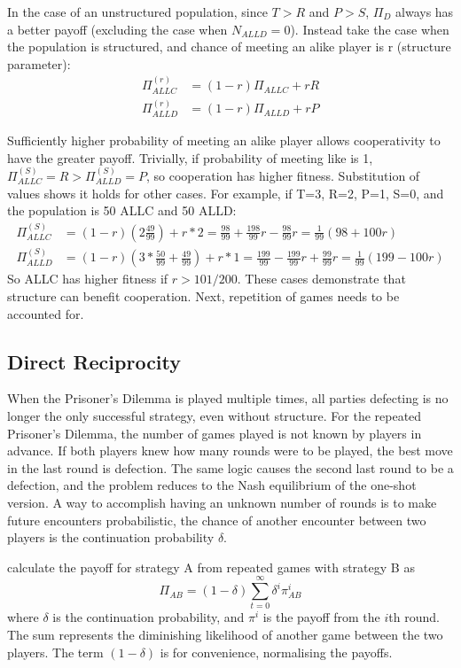 \documentclass[a4paper,11pt,bcshonoursthesis,singlespace,twoside]{cssethesis}
\begin{document}
In the case of an unstructured population, since $T>R$ and $P>S$, $\Pi_D$ always has a better payoff (excluding the case when $N_{ALLD}=0$). 
Instead take the case when the population is structured, and chance of meeting an alike player is r (structure parameter):
\begin{align*}
\Pi^{(r)}_{ALLC}&=(1-r)\Pi_{ALLC}+ rR\\
\Pi^{(r)}_{ALLD}&=(1-r)\Pi_{ALLD}+ rP
\end{align*}

Sufficiently higher probability of meeting an alike player allows cooperativity to have the greater payoff. 
Trivially, if probability of meeting like is 1, $\Pi^{(S)}_{ALLC}=R>\Pi^{(S)}_{ALLD}=P$, so cooperation has higher fitness.  
Substitution of values shows it holds for other cases. 
For example, if T=3, R=2, P=1, S=0, and the population is 50 ALLC and 50 ALLD:
\begin{align*}
\Pi^{(S)}_{ALLC}&=(1-r)(2\frac{49}{99})+r*2=\frac{98}{99}+\frac{198}{99}r-\frac{98}{99}r=\frac{1}{99}(98+100r)\\
\Pi^{(S)}_{ALLD}&=(1-r)(3*\frac{50}{99} + \frac{49}{99})+ r*1=\frac{199}{99}-\frac{199}{99}r+\frac{99}{99}r=\frac{1}{99}(199-100r)
\end{align*}
So ALLC has higher fitness if $r>101/200$. These cases demonstrate that structure can benefit cooperation. 
Next, repetition of games needs to be accounted for. 
\subsection{Direct Reciprocity}
When the Prisoner's Dilemma is played multiple times, all parties defecting is no longer the only successful strategy, even without structure. 
For the repeated Prisoner's Dilemma, the number of games played is not known by players in advance. 
If both players knew how many rounds were to be played, the best move in the last round is defection. 
The same logic causes the second last round to be a defection, and the problem reduces to the Nash equilibrium of the one-shot version. 
A way to accomplish having an unknown number of rounds is to make future encounters probabilistic, the chance of another encounter between two players is the continuation probability $\delta$.

\citet{garcia:PLoSOne:2012} calculate the payoff for strategy A from repeated games with strategy B as
\begin{equation}
\label{eqn:repeatedPayoff}
\Pi_{AB}=(1-\delta)\sum^{\infty}_{t=0} \delta^i\pi^i_{AB}
\end{equation}
where $\delta$ is the continuation probability, and $\pi^i$ is the payoff from the $i$th round. 
The sum represents the diminishing likelihood of another game between the two players. 
The term $(1-\delta)$ is for convenience, normalising the payoffs.
 
\end{document}
